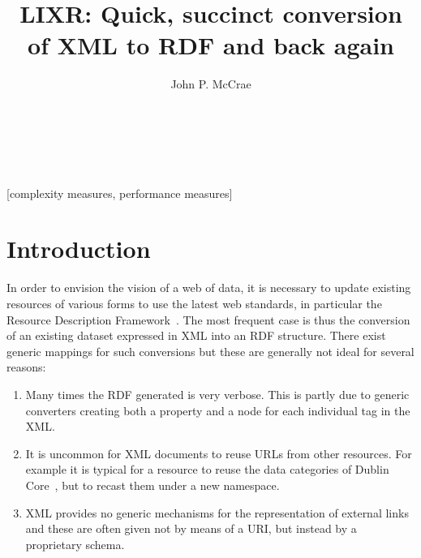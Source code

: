 \documentclass{acm_proc_article-sp}
\begin{document}
\title{LIXR: Quick, succinct conversion of XML to RDF and back again}


\author{
\alignauthor
John P. McCrae\\
       \\
       \\
       \\
}

\maketitle
\begin{abstract}
\end{abstract}

[complexity measures, performance measures]



\section{Introduction}

In order to envision the vision of a web of data, it is necessary to update existing 
resources of various forms to use the latest web standards, in particular the 
Resource Description Framework~\cite[RDF]{cyganiak2014rdf}. The most frequent case is thus the
conversion of an existing dataset expressed in XML into an RDF structure. There
exist generic mappings for such conversions but these are generally not ideal for
several reasons:

\begin{enumerate}
\item Many times the RDF generated is very verbose. This is partly due to generic
converters creating both a property and a node for each individual tag in the XML.
\item It is uncommon for XML documents to reuse URLs from other resources. For
example it is typical for a resource to reuse the data categories of Dublin Core~\cite{weibel1998dublin}, 
but to recast them under a new namespace.
\item XML provides no generic mechanisms for the representation of external links
and these are often given not by means of a URI, but instead by a proprietary schema.
\end{enumerate}
\end{document}
